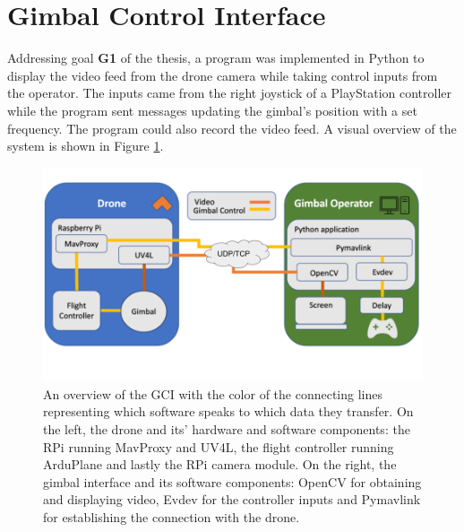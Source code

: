 \documentclass[nofilelist]{cslthse-msc}
\begin{document}
\section{Gimbal Control Interface}
Addressing goal \textbf{G1} of the thesis, a program was implemented in Python to display the video feed from the drone camera while taking control inputs from the operator. The inputs came from the right joystick of a PlayStation controller while the program sent messages updating the gimbal's position with a set frequency. The program could also record the video feed. A visual overview of the system is shown in Figure \ref{fig:system-overview}.
\begin{figure}[!hbt]
   \centering
   \includegraphics[scale=0.4]{images/system-overview.png} 
   \caption{An overview of the GCI with the color of the connecting lines representing which software speaks to which data they transfer. On the left, the drone and its' hardware and software components: the RPi running MavProxy and UV4L, the flight controller running ArduPlane and lastly the RPi camera module. On the right, the gimbal interface and its software components: OpenCV for obtaining and displaying video, Evdev for the controller inputs and Pymavlink for establishing the connection with the drone. }
   \label{fig:system-overview}
\end{figure}
\end{document}
